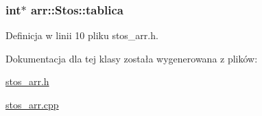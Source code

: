 \hypertarget{classarr_1_1_stos_ad8e05da5f97f966b3c4f21d661e88b05}{
\subsubsection[{tablica}]{\setlength{\rightskip}{0pt plus 5cm}int$\ast$ arr\-::\-Stos\-::tablica\hspace{0.3cm}{\ttfamily [private]}}}\label{classarr_1_1_stos_ad8e05da5f97f966b3c4f21d661e88b05}


Definicja w linii 10 pliku stos\-\_\-arr.\-h.



Dokumentacja dla tej klasy została wygenerowana z plików\-:\begin{DoxyCompactItemize}
\item 
\hyperlink{stos__arr_8h}{stos\-\_\-arr.\-h}\item 
\hyperlink{stos__arr_8cpp}{stos\-\_\-arr.\-cpp}\end{DoxyCompactItemize}
